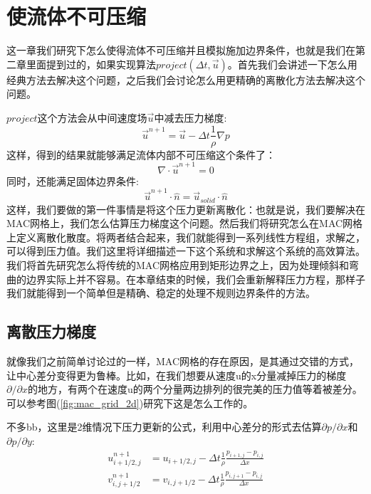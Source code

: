 \documentclass{article}
\begin{document}
\section{使流体不可压缩}
这一章我们研究下怎么使得流体不可压缩并且模拟施加边界条件，也就是我们在第二章里面提到过的，如果实现算法$project(\Delta t,\vec{u})$。首先我们会讲述一下怎么用经典方法去解决这个问题，之后我们会讨论怎么用更精确的离散化方法去解决这个问题。
\par
$project$这个方法会从中间速度场$\vec{u}$中减去压力梯度:
\begin{equation}
\vec{u}^{n+1}=\vec{u}-\Delta{t}\frac{1}{\rho}\nabla{p}
\end{equation}
这样，得到的结果就能够满足流体内部不可压缩这个条件了：
\begin{equation}
\nabla\cdot{\vec{u}^{n+1}}=0
\end{equation}
同时，还能满足固体边界条件:
\begin{equation}
\vec{u}^{n+1}\cdot{\hat{n}}=\vec{u}_{solid}\cdot{\hat{n}}
\end{equation}
这样，我们要做的第一件事情是将这个压力更新离散化：也就是说，我们要解决在MAC网格上，我们怎么估算压力梯度这个问题。然后我们将研究怎么在MAC网格上定义离散化散度。将两者结合起来，我们就能得到一系列线性方程组，求解之，可以得到压力值。我们这里将详细描述一下这个系统和求解这个系统的高效算法。我们将首先研究怎么将传统的MAC网格应用到矩形边界之上，因为处理倾斜和弯曲的边界实际上并不容易。在本章结束的时候，我们会重新解释压力方程，那样子我们就能得到一个简单但是精确、稳定的处理不规则边界条件的方法。
\subsection{离散压力梯度}
就像我们之前简单讨论过的一样，MAC网格的存在原因，是其通过交错的方式，让中心差分变得更为鲁棒。比如，在我们想要从速度u的x分量减掉压力的梯度$\partial/\partial{x}$的地方，有两个在速度u的两个分量两边排列的很完美的压力值等着被差分。可以参考图(\ref{fig:mac_grid_2d})研究下这是怎么工作的。
\par
不多bb，这里是2维情况下压力更新的公式，利用中心差分的形式去估算$\partial{p}/\partial{x}$和$\partial{p}/\partial{y}$:
\begin{equation}
\begin{aligned}
u_{i+1/2,j}^{n+1}&=u_{i+1/2,j}-\Delta{t}\frac{1}{\rho}\frac{p_{i+1,j}-p_{i,j}}{\Delta{x}} \\
v_{i,j+1/2}^{n+1}&=v_{i,j+1/2}-\Delta{t}\frac{1}{\rho}\frac{p_{i,j+1}-p_{i,j}}{\Delta{x}} \\
\end{aligned}
\end{equation}
\end{document}
